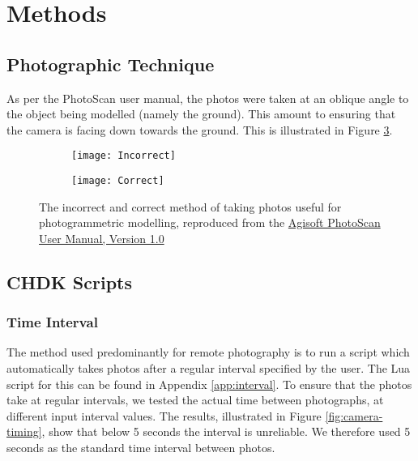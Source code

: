 \section{Methods}

\subsection{Photographic Technique}

As per the PhotoScan user
manual, the
photos were taken at an oblique angle to the object being modelled (namely the
ground). This amount to ensuring that the camera is facing down towards the
ground. This is illustrated in Figure \ref{img:photographic-method}.

\begin{figure}
    \centering
    \begin{subfigure}[b]{0.49\textwidth}
        \texttt{[image: Incorrect]}
        \label{img:incorrect}
    \end{subfigure}
    \begin{subfigure}[b]{0.49\textwidth}
        \texttt{[image: Correct]}
        \label{img:correct}
    \end{subfigure}
    \caption{The incorrect and correct method of taking photos useful for
        photogrammetric modelling, reproduced from the
        \href{http://downloads.agisoft.ru/pdf/photoscan-pro\_1\_0\_0\_en.pdf}{Agisoft
        PhotoScan User Manual, Version 1.0}}
    \label{img:photographic-method}
\end{figure}

\subsection{CHDK Scripts}

\subsubsection{Time Interval}

The method used predominantly for remote photography is to run a script which
automatically takes photos after a regular interval specified by the user. The
Lua script for this can be found in Appendix \ref{app:interval}. To ensure that
the photos take at regular intervals, we tested the actual time between
photographs, at different input interval values. The results, illustrated in
Figure \ref{fig:camera-timing}, show that below 5 seconds the interval is
unreliable. We therefore used 5 seconds as the standard time interval between
photos.

